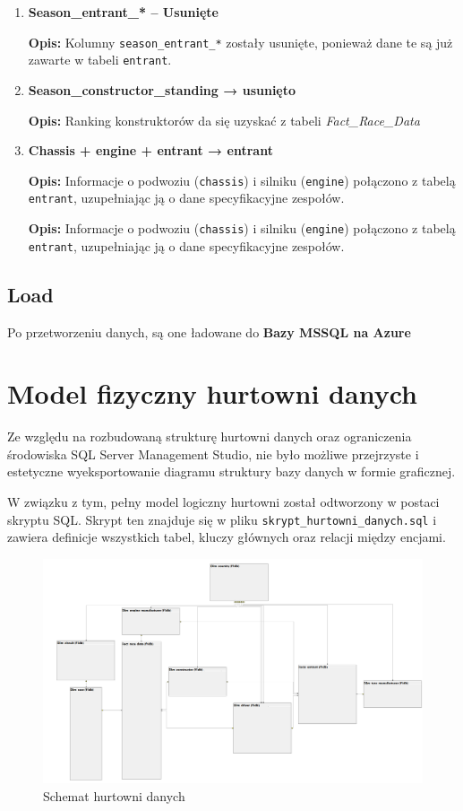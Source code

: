 \documentclass[12pt]{article}
\begin{document}
\begin{enumerate}
    \item \textbf{Season\_entrant\_* – Usunięte}

    \textbf{Opis:} Kolumny \texttt{season\_entrant\_*} zostały usunięte, ponieważ dane te są już zawarte w tabeli \texttt{entrant}.

    \item \textbf{Season\_constructor\_standing → usunięto}

    \textbf{Opis:} Ranking konstruktorów da się uzyskać z tabeli \textit{Fact\_Race\_Data}

    \item \textbf{Chassis + engine + entrant → entrant}

    \textbf{Opis:} Informacje o podwoziu (\texttt{chassis}) i silniku (\texttt{engine}) połączono z tabelą \texttt{entrant}, uzupełniając ją o dane specyfikacyjne zespołów.


    \textbf{Opis:} Informacje o podwoziu (\texttt{chassis}) i silniku (\texttt{engine}) połączono z tabelą \texttt{entrant}, uzupełniając ją o dane specyfikacyjne zespołów.

\end{enumerate}

\subsection{Load}

Po przetworzeniu danych, są one ładowane do \textbf{Bazy MSSQL na Azure}


\section{Model fizyczny hurtowni danych}

Ze względu na rozbudowaną strukturę hurtowni danych oraz ograniczenia środowiska SQL Server Management Studio, nie było możliwe przejrzyste i estetyczne wyeksportowanie diagramu struktury bazy danych w formie graficznej.

W związku z tym, pełny model logiczny hurtowni został odtworzony w postaci skryptu SQL. Skrypt ten znajduje się w pliku \texttt{skrypt\_hurtowni\_danych.sql} i zawiera definicje wszystkich tabel, kluczy głównych oraz relacji między encjami.

\begin{figure}[H]
    \centering
    \includegraphics[width=\textwidth]{diagram1.png}
    \caption{Schemat hurtowni danych}
\end{figure}
\end{document}
